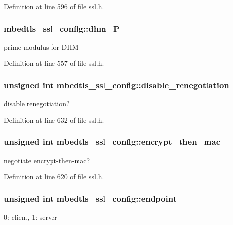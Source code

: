 Definition at line 596 of file ssl.\-h.

\hypertarget{structmbedtls__ssl__config_af6043fc1d3fd43d571ec8faa9de3906d}{
\subsubsection[{dhm\-\_\-\-P}]{ mbedtls\-\_\-ssl\-\_\-config\-::dhm\-\_\-\-P}}\label{structmbedtls__ssl__config_af6043fc1d3fd43d571ec8faa9de3906d}
prime modulus for D\-H\-M 

Definition at line 557 of file ssl.\-h.

\hypertarget{structmbedtls__ssl__config_a953d3f0bbb40ed6f4020dc3e1a196dfb}{
\subsubsection[{disable\-\_\-renegotiation}]{\setlength{\rightskip}{0pt plus 5cm}unsigned int mbedtls\-\_\-ssl\-\_\-config\-::disable\-\_\-renegotiation}}\label{structmbedtls__ssl__config_a953d3f0bbb40ed6f4020dc3e1a196dfb}
disable renegotiation? 

Definition at line 632 of file ssl.\-h.

\hypertarget{structmbedtls__ssl__config_a8f9e666cb46e055bed2b799a94a85e3e}{
\subsubsection[{encrypt\-\_\-then\-\_\-mac}]{\setlength{\rightskip}{0pt plus 5cm}unsigned int mbedtls\-\_\-ssl\-\_\-config\-::encrypt\-\_\-then\-\_\-mac}}\label{structmbedtls__ssl__config_a8f9e666cb46e055bed2b799a94a85e3e}
negotiate encrypt-\/then-\/mac? 

Definition at line 620 of file ssl.\-h.

\hypertarget{structmbedtls__ssl__config_a7ee72d610d141b932141bf8afb3aec2a}{
\subsubsection[{endpoint}]{\setlength{\rightskip}{0pt plus 5cm}unsigned int mbedtls\-\_\-ssl\-\_\-config\-::endpoint}}\label{structmbedtls__ssl__config_a7ee72d610d141b932141bf8afb3aec2a}
0\-: client, 1\-: server 


